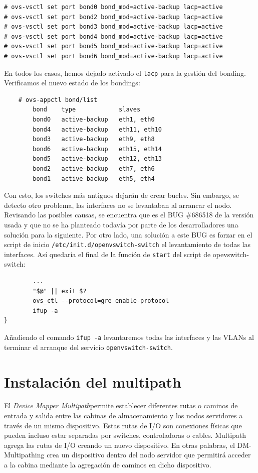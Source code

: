 \documentclass[12pt,a4paper,titlepage,twoside]{report}
\begin{document}
\begin{verbatim}
# ovs-vsctl set port bond0 bond_mod=active-backup lacp=active
# ovs-vsctl set port bond2 bond_mod=active-backup lacp=active
# ovs-vsctl set port bond3 bond_mod=active-backup lacp=active
# ovs-vsctl set port bond4 bond_mod=active-backup lacp=active
# ovs-vsctl set port bond5 bond_mod=active-backup lacp=active
# ovs-vsctl set port bond6 bond_mod=active-backup lacp=active
\end{verbatim}
En todos los casos, hemos dejado activado el \verb|lacp| para la gestión del bonding. Verificamos el nuevo estado de los bondings: 
\begin{verbatim}
    # ovs-appctl bond/list
        bond    type            slaves
        bond0   active-backup   eth1, eth0    
        bond4   active-backup   eth11, eth10  
        bond3   active-backup   eth9, eth8    
        bond6   active-backup   eth15, eth14  
        bond5   active-backup   eth12, eth13  
        bond2   active-backup   eth7, eth6    
        bond1   active-backup   eth5, eth4
\end{verbatim}
Con esto, los switches más antiguos dejarán de crear bucles. Sin embargo, se detecto otro problema, las interfaces no se levantaban al arrancar el nodo. Revisando las posibles causas, se encuentra que es el BUG \#686518\cite{bug} de la versión usada y que no se ha planteado todavía por parte de los desarrolladores una solución para la siguiente. Por otro lado, una solución a este BUG es forzar en el script de inicio  \verb|/etc/init.d/openvswitch-switch| el levantamiento de todas las interfaces. Así quedaría el final de la función de \verb|start| del script de opevswitch-switch:
\begin{verbatim}
        ...
        "$@" || exit $?
        ovs_ctl --protocol=gre enable-protocol
        ifup -a
}
\end{verbatim}
Añadiendo el comando \verb|ifup -a| levantaremos todas las interfaces y las VLANs al terminar el arranque del servicio \verb|openvswitch-switch|.
\section{Instalación del multipath}
El \textit{Device Mapper Multipath}permite establecer diferentes rutas o caminos de entrada y salida entre las cabinas de almacenamiento y los nodos servidores a través de un mismo dispositivo. Estas rutas de I/O son conexiones físicas que pueden incluso estar separadas por switches, controladoras o cables. Multipath agrega las rutas de I/O creando un nuevo dispositivo. En otras palabras, el DM-Multipathing crea un dispositivo dentro del nodo servidor que permitirá acceder a la cabina mediante la agregación de caminos en dicho dispositivo. 
\end{document}
